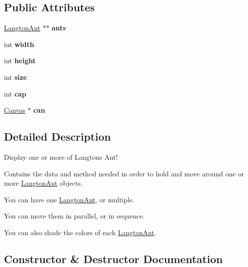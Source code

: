 \subsection*{Public Attributes}
\begin{DoxyCompactItemize}
\item 
\mbox{\label{class_ant_farm_a6b2f02189482c7bacde7ddaf9794de68}} 
\hyperlink{class_langton_ant}{Langton\+Ant} $\ast$$\ast$ {\bfseries ants}
\item 
\mbox{\label{class_ant_farm_a073edbf5a8226b15d8a6c962612bab5a}} 
int {\bfseries width}
\item 
\mbox{\label{class_ant_farm_a63cce968f831f6ea3cc699fae67295d4}} 
int {\bfseries height}
\item 
\mbox{\label{class_ant_farm_a67f9ece3e5d9b89269fea33e8252e77c}} 
int {\bfseries size}
\item 
\mbox{\label{class_ant_farm_a6609ec5efe8166f023ba360f415afe77}} 
int {\bfseries cap}
\item 
\mbox{\label{class_ant_farm_aa617c67c5017be560f6da73d1ef15a1b}} 
\hyperlink{classtsgl_1_1_canvas}{Canvas} $\ast$ {\bfseries can}
\end{DoxyCompactItemize}


\subsection{Detailed Description}
Display one or more of Langton\textquotesingle{}s Ant! 

Contains the data and method needed in order to hold and move around one or more \hyperlink{class_langton_ant}{Langton\+Ant} objects.

You can have one \hyperlink{class_langton_ant}{Langton\+Ant}, or multiple.

You can move them in parallel, or in sequence.

You can also shade the colors of each \hyperlink{class_langton_ant}{Langton\+Ant}. 

\subsection{Constructor \& Destructor Documentation}
\mbox{\label{class_ant_farm_af788cadd7ccb425440294af033fc6159}} 
